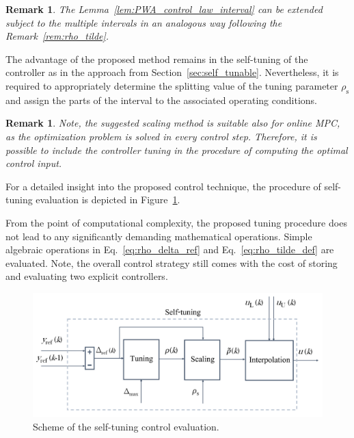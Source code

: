 \documentclass[preprint,12pt]{elsarticle}
\newtheorem{remark}[theorem]{Remark}
\begin{document}
	\begin{remark}
		The Lemma~\ref{lem:PWA_control_law_interval} can be extended subject to the multiple intervals in an analogous way following the Remark~\ref{rem:rho_tilde}.
	\end{remark}
	
	The advantage of the proposed method remains in the self-tuning of the controller as in the approach from Section~\ref{sec:self_tunable}. Nevertheless, it is required to appropriately determine the splitting value of the tuning parameter $\rho_{\mathrm{s}}$ and assign the parts of the interval to the associated operating conditions.
	
	\begin{remark}
		Note, the suggested scaling method is suitable also for online MPC, as the optimization problem is solved in every control step. Therefore, it is possible to include the controller tuning in the procedure of computing the optimal control input.   
	\end{remark}
	
	For a detailed insight into the proposed control technique, the procedure of self-tuning evaluation is depicted in Figure~\ref{fig:tuning}. 
	
	From the point of computational complexity, the proposed tuning procedure does not lead to any significantly demanding mathematical operations. Simple algebraic operations in Eq.~\eqref{eq:rho_delta_ref} and Eq.~\eqref{eq:rho_tilde_def} are evaluated. Note, the overall control strategy still comes with the cost of storing and evaluating two explicit controllers.
	
	\begin{figure}
		\begin{center}
			\includegraphics[width=\textwidth]{images/tuning2}
			\caption[Self-tuning scheme]{Scheme of the self-tuning control evaluation.}
			\label{fig:tuning}
		\end{center}
	\end{figure}
	
\end{document}
